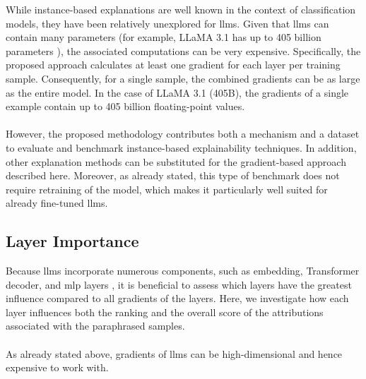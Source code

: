 While instance-based explanations are well known in the context of classification models, they have been relatively unexplored for \acrlong{llm}s. Given that \acrlong{llm}s can contain many parameters (for example, LLaMA 3.1 has up to 405 billion parameters \cite{meta_ai_llama_3_1}), the associated computations can be very expensive. Specifically, the proposed approach calculates at least one gradient for each layer per training sample. Consequently, for a single sample, the combined gradients can be as large as the entire model. In the case of LLaMA 3.1 (405B), the gradients of a single example contain up to 405 billion floating-point values.
\\\\
However, the proposed methodology contributes both a mechanism and a dataset to evaluate and benchmark instance-based explainability techniques. In addition, other explanation methods can be substituted for the gradient-based approach described here. Moreover, as already stated, this type of benchmark does not require retraining of the model, which makes it particularly well suited for already fine-tuned \acrshort{llm}s.

\subsection{Layer Importance}
Because \acrshort{llm}s incorporate numerous components, such as embedding, Transformer decoder, and \acrshort{mlp} layers \cite{Rosenblatt1958-mn}, it is beneficial to assess which layers have the greatest influence compared to all gradients of the layers. Here, we investigate how each layer influences both the ranking and the overall score of the attributions associated with the paraphrased samples.
\\\\
As already stated above, gradients of \acrshort{llm}s can be high-dimensional and hence expensive to work with. 


